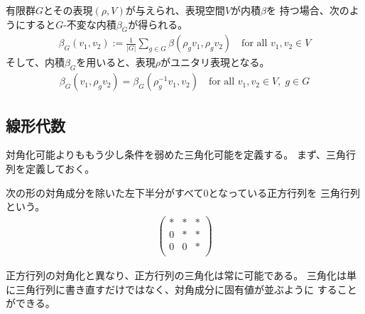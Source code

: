 {	\begin{todo}[ここまで]\label{todo:ここまで} %
		有限群$G$とその表現$(\rho,V)$が与えられ、表現空間$V$が内積$\beta$を
		持つ場合、次のようにすると$G$-不変な内積$\beta_G$が得られる。
		\begin{equation*}\begin{split}
			\beta_G(v_1, v_2) 
			:= \frac{1}{|G|}\sum_{g\in G} \beta(\rho_gv_1, \rho_gv_2)
			\quad\text{for all } v_1,v_2\in V
		\end{split}\end{equation*}
		そして、内積$\beta_G$を用いると、表現$\rho$がユニタリ表現となる。
		\begin{equation*}\begin{split}
			\beta_G(v_1, \rho_gv_2) = \beta_G(\rho_g^{-1}v_1, v_2)
			\quad\text{for all } v_1,v_2\in V,\; g\in G
		\end{split}\end{equation*}
	\end{todo} %
\subsection{線形代数}\label{s2:線形代数} %
	対角化可能よりももう少し条件を弱めた三角化可能を定義する。
	まず、三角行列を定義しておく。

	\begin{definition}[三角行列]\label{def:三角行列} %
		次の形の対角成分を除いた左下半分がすべて$0$となっている正方行列を
		三角行列という。
		\begin{equation*}\begin{split}
			\begin{pmatrix}
				* & * & * \\
				0 & * & * \\
				0 & 0 & * \\
			\end{pmatrix}
		\end{split}\end{equation*}
	\end{definition} %

	正方行列の対角化と異なり、正方行列の三角化は常に可能である。
	三角化は単に三角行列に書き直すだけではなく、対角成分に固有値が並ぶように
	することができる。

}
